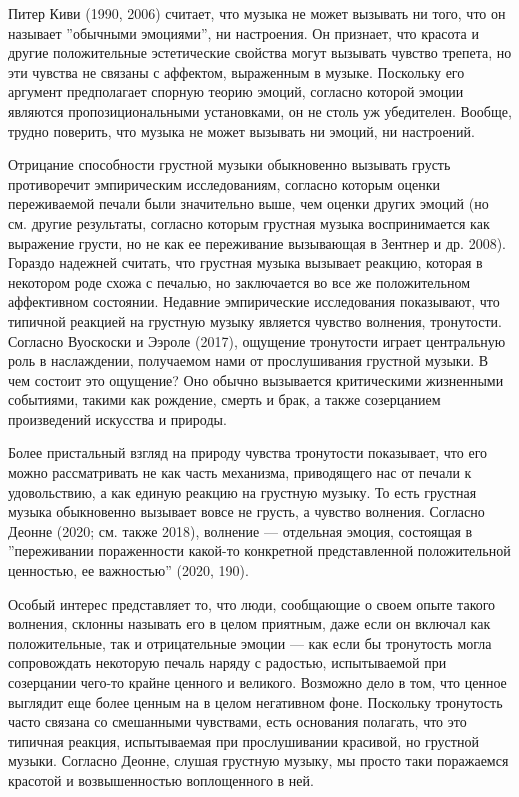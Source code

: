\documentclass[11pt]{book}
\begin{document}
Питер Киви (1990, 2006) считает, что музыка не может вызывать ни того, что он называет ''обычными эмоциями'', ни настроения. Он признает, что красота и другие положительные эстетические свойства могут вызывать чувство трепета, но эти чувства не связаны с аффектом, выраженным в музыке. Поскольку его аргумент предполагает спорную теорию эмоций, согласно которой эмоции являются пропозициональными установками, он не столь уж убедителен. Вообще, трудно поверить, что музыка не может вызывать ни эмоций, ни настроений.

Отрицание способности грустной музыки обыкновенно вызывать грусть противоречит эмпирическим исследованиям, согласно которым оценки переживаемой печали были значительно выше, чем оценки других эмоций (но см. другие результаты, согласно которым грустная музыка воспринимается как выражение грусти, но не как ее переживание вызывающая в Зентнер и др. 2008). Гораздо надежней считать, что грустная музыка вызывает реакцию, которая в некотором роде схожа с печалью, но заключается во все же положительном аффективном состоянии. Недавние эмпирические исследования показывают, что типичной реакцией на грустную музыку является чувство волнения, тронутости. Согласно Вуоскоски и Ээроле (2017), ощущение тронутости играет центральную роль в наслаждении, получаемом нами от прослушивания грустной музыки. В чем состоит это ощущение? Оно обычно вызывается критическими жизненными событиями, такими как рождение, смерть и брак, а также созерцанием произведений искусства и природы.

Более пристальный взгляд на природу чувства тронутости показывает, что его можно рассматривать не как часть механизма, приводящего нас от печали к удовольствию, а как единую реакцию на грустную музыку. То есть грустная музыка обыкновенно вызывает вовсе не грусть, а чувство волнения. Согласно Деонне (2020; см. также 2018), волнение --- отдельная эмоция, состоящая в ''переживании пораженности какой-то конкретной представленной положительной ценностью, ее важностью'' (2020, 190).

Особый интерес представляет то, что люди, сообщающие о своем опыте такого волнения, склонны называть его в целом приятным, даже если он включал как положительные, так и отрицательные эмоции --- как если бы тронутость могла сопровождать некоторую печаль наряду с радостью, испытываемой при созерцании чего-то крайне ценного и великого. Возможно дело в том, что ценное выглядит еще более ценным на в целом негативном фоне. Поскольку тронутость часто связана со смешанными чувствами, есть основания полагать, что это типичная реакция, испытываемая при прослушивании красивой, но грустной музыки. Согласно Деонне, слушая грустную музыку, мы просто таки поражаемся красотой и возвышенностью воплощенного в ней.
\end{document}
